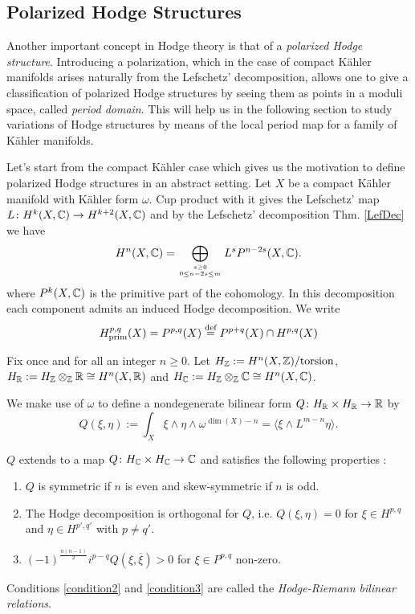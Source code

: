 \documentclass[../main.tex]{subfiles}
\begin{document}
\subsection{Polarized Hodge Structures}

Another important concept in Hodge theory is that of a \emph{polarized Hodge structure}. Introducing a polarization, which in the case of compact K\"{a}hler manifolds arises naturally from the Lefschetz' decomposition, allows one to give a classification of polarized Hodge structures by seeing them as points in a moduli space, called \emph{period domain}.
This will help us in the following section to study variations of Hodge structures by means of the local period map for a family of K\"{a}hler manifolds. 

Let's start from the compact K\"{a}hler case which gives us the motivation to define polarized Hodge structures in an abstract setting.
Let $X$ be a compact K\"{a}hler manifold with K\"{a}hler form $\omega$. Cup product with it gives the Lefschetz' map $L \colon H^k(X,\mathbb{C}) \to H^{k+2}(X,\mathbb{C}) $ and by the Lefschetz' decomposition Thm. \ref{LefDec} we have
\[
H^n(X,\mathbb{C}) = \bigoplus_{s \geq 0 \atop 0 \leq n-2s \leq m} L^sP^{n-2s}(X,\mathbb{C}).
\]
where $P^k(X,\mathbb{C})$ is the primitive part of the cohomology.
In this decomposition each component admits an induced Hodge decomposition.
We write
\begin{align*}
H^{p,q}_{\text{prim}}(X) = P^{p,q}(X) \stackrel{\text{def}}{=} P^{p+q}(X) \cap H^{p,q}(X)
\end{align*}

Fix once and for all an integer $n \geq 0$. Let $H_{\mathbb{Z}}:=H^n(X,\mathbb{Z})/\mathrm{torsion}$, $H_{\mathbb{R}} := H_{\mathbb{Z}}\otimes_{\mathbb{Z}}\mathbb{R} \cong H^n(X,\mathbb{R})$ and $H_{\mathbb{C}} := H_{\mathbb{Z}}\otimes_{\mathbb{Z}}\mathbb{C} \cong H^n(X,\mathbb{C})$.

We make use of $\omega$ to define a nondegenerate bilinear form
$Q\colon H_{\mathbb{R}} \times H_{\mathbb{R}} \to \mathbb{R}$ by
\[ Q(\xi,\eta) := \int_X \xi \wedge \eta \wedge \omega^{\dim(X)-n} = \langle  \xi \wedge L^{m-n} \eta \rangle .\]


$Q$ extends to a map $Q\colon H_{\mathbb{C}} \times H_{\mathbb{C}} \to \mathbb{C}$ and satisfies the following properties \cite[Sect. 7.1.2]{Voi07}:
\begin{enumerate}
\item $Q$ is symmetric if $n$ is even and skew-symmetric if $n$ is odd.
\item \label{condition2} The Hodge decomposition is orthogonal for $Q$, i.e. $Q(\xi,\eta) = 0$ for $\xi \in H^{p,q}$ and $\eta \in H^{p',q'}$ with $p \neq q'$.
\item \label{condition3} $(-1)^{\frac{n(n-1)}{2}} i^{p-q} Q(\xi,\overline{\xi}) > 0$ for $\xi \in P^{p,q}$ non-zero.
\end{enumerate}
Conditions \eqref{condition2} and \eqref{condition3} are called the \emph{Hodge-Riemann bilinear relations}.
\end{document}
